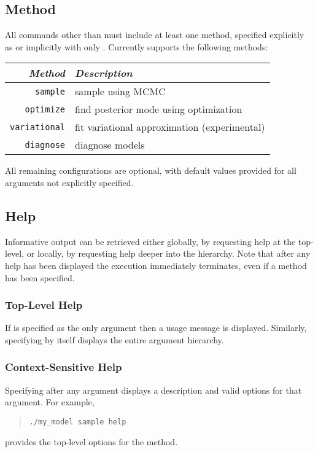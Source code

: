 \subsection{Method}

All commands other than  must include at least one
method, specified explicitly as  or
implicitly with only .  Currently \CmdStan supports
the following methods:
%
\begin{center}
\begin{tabular}{r|l}
{\it Method} & {\it Description} \\ \hline \hline
{\tt sample}   &  sample using MCMC
\\
{\tt optimize} &  find posterior mode using optimization
\\
{\tt variational} &  fit variational approximation (experimental)
\\
{\tt diagnose} &  diagnose models
\end{tabular}
\end{center}
%
All remaining configurations are optional, with default values
provided for all arguments not explicitly specified.

\subsection{Help}

Informative output can be retrieved either globally, by requesting help
at the top-level, or locally, by requesting help deeper into the hierarchy.
Note that after any help has been displayed the execution immediately
terminates, even if a method has been specified.

\subsubsection{Top-Level Help}

If  is specified as the only argument then a usage message is
displayed.  Similarly, specifying  by itself displays the entire
argument hierarchy.

\subsubsection{Context-Sensitive Help}

Specifying  after any argument displays a description and
valid options for that argument.  For example,
%
\begin{quote}
\begin{Verbatim}[fontshape=sl]
./my_model sample help
\end{Verbatim}
\end{quote}
%
provides the top-level options for the  method.

